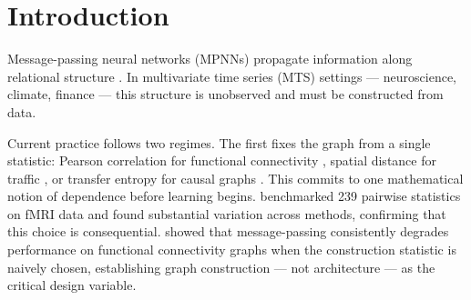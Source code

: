\documentclass{article}
\theoremstyle{plain}
\begin{document}
\onecolumn
{}


\begin{icmlauthorlist}
\end{icmlauthorlist}


\vskip 0.3in

\printAffiliationsAndNotice{}

\begin{abstract}
Graph neural networks for multivariate time series require a relational graph that is rarely given. We parameterise graph construction over a vocabulary of $K \approx 125$ named pairwise statistics --- causal, spectral, linear, information-theoretic --- computed via \texttt{pyspi} \citep{cliff2023}. A learned weight vector $\mathbf{w}$, jointly optimised with a message-passing network, selects which statistical notion of coupling is task-relevant and produces an interpretable statistical signature of the relational structure. We show that symmetric construction operators cannot distinguish Markov-equivalent topologies, and confirm this empirically: symmetric baselines remain at or below 59\% on a synthetic classification task while vocabulary-based models achieve near-perfect accuracy. The learned $\mathbf{w}$ recovers spectral Granger causality as the dominant coupling mode, matching the generating process.
\end{abstract}

\section{Introduction}
\label{sec:intro}

Message-passing neural networks (MPNNs) propagate information along relational structure \citep{gilmer2017,battaglia2018}. In multivariate time series (MTS) settings --- neuroscience, climate, finance --- this structure is unobserved and must be constructed from data.

Current practice follows two regimes. The first fixes the graph from a single statistic: Pearson correlation for functional connectivity \citep{bullmore2009}, spatial distance for traffic \citep{li2018dcrnn}, or transfer entropy for causal graphs \citep{duan2023}. This commits to one mathematical notion of dependence before learning begins. \citet{liu2025} benchmarked 239 pairwise statistics on fMRI data and found substantial variation across methods, confirming that this choice is consequential. \citet{qi2025} showed that message-passing consistently degrades performance on functional connectivity graphs when the construction statistic is naively chosen, establishing graph construction --- not architecture --- as the critical design variable.
\end{document}
